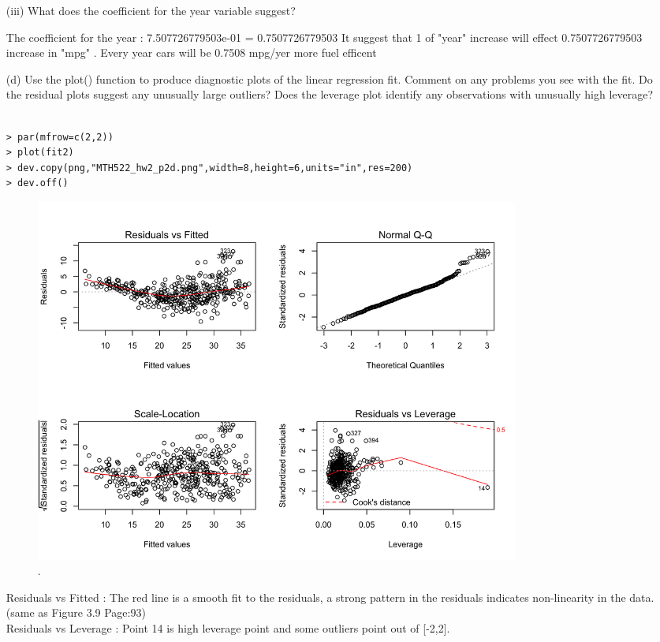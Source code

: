 \documentclass{article}
\begin{document}
\begin{itemize}
\item[(iii)] What does the coefficient for the year variable suggest?

The coefficient for the year : 7.507726779503e-01 = 0.7507726779503
It suggest that 1 of "year" increase will effect 0.7507726779503 increase in "mpg" . 
Every year cars will be 0.7508 mpg/yer more fuel efficent 





\item[(d)] Use the plot() function to produce diagnostic plots of the linear regression fit. Comment on any problems you see with the fit. Do the residual plots suggest any unusually large outliers? Does the leverage plot identify any observations with unusually high leverage?



\begin{program}
\begin{verbatim}
	
> par(mfrow=c(2,2))
> plot(fit2)
> dev.copy(png,"MTH522_hw2_p2d.png",width=8,height=6,units="in",res=200)
> dev.off()
\end{verbatim}
\caption{The R code used to generate Figure.\ \ref{fig:MTH522_hw2_p2d}.}
\end{program}


\begin{figure}[htb]
	\begin{center}
		\includegraphics[width=0.8\textwidth]{MTH522_hw2_p2d.png}
	\end{center}
	\caption{.}
	\label{fig:MTH522_hw2_p2d}
\end{figure}

Residuals vs Fitted : The red line is a smooth fit to the residuals, a strong pattern in the residuals indicates non-linearity in the data. (same as Figure 3.9 Page:93)
\\Residuals vs Leverage : Point 14 is high leverage point and some outliers point out of [-2,2].




\end{itemize}
\end{document}
